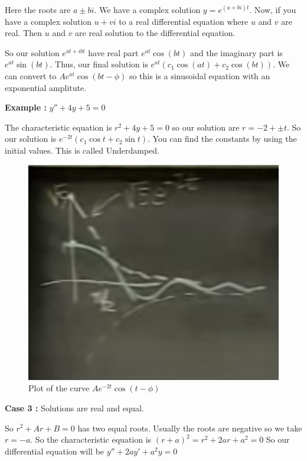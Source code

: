 Here the roots are $a \pm bi$. 
We have a complex solution $y = e^{(a+bi)t}$.
Now, if you have a complex solution $u + vi$ to a real differential equation 
where $u$ and $v$ are real. Then $u$ and $v$ are real solution to the differential equation. 

So our solution $e^{at + ibt}$ have real part $e^{at}\cos(bt)$ and the imaginary part is $e^{at}\sin(bt)$.
Thus, our final solution is $e^{at}(c_1 \cos(at) + c_2 \cos(bt))$.
We can convert to $Ae^{at} \cos(bt - \phi)$ 
so this is a sinusoidal equation with an exponential amplitute.

{\bf Example : } $y'' + 4y + 5 = 0$

The characteristic equation is $r^2 + 4y + 5 = 0$ so our solution are $r = -2 + \pm t$.
So our solution is $e^{-2t}(c_1 \cos t + c_2 \sin t)$.
You can find the constants by using the initial values.
This is called Underdamped.

\begin{figure}[ht!]
	\centering
	\includegraphics[scale=0.25]{./images/lecture_9_figure_2.png}
	\caption{Plot of the curve $Ae^{-2t}\cos(t - \phi)$}
\end{figure}

{\bf Case 3 : } Solutions are real and equal.

So $r^2 + Ar + B = 0$ has two equal roots.
Usually the roots are negative so we take $r = -a$.
So the characteristic equation is $(r+a)^2 = r^2 + 2ar + a^2 = 0$
So our differential equation will be $y'' + 2a y' + a^2 y = 0$

